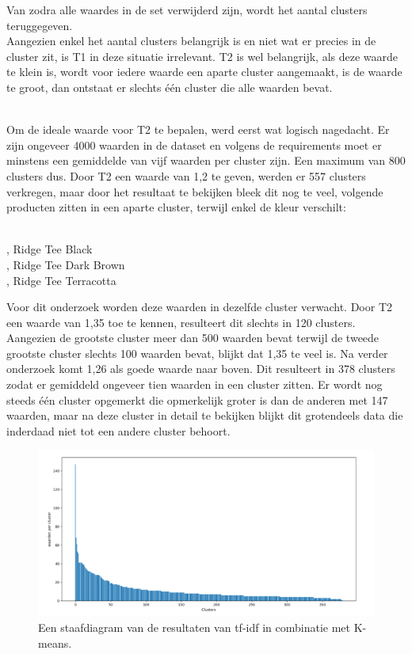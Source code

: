 Van zodra alle waardes in de set verwijderd zijn, wordt het aantal clusters teruggegeven.
\\\indent
Aangezien enkel het aantal clusters belangrijk is en niet wat er precies in de cluster zit, is T1 in deze situatie irrelevant. T2 is wel belangrijk, als deze waarde te klein is, wordt voor iedere waarde een aparte cluster aangemaakt, is de waarde te groot, dan ontstaat er slechts één cluster die alle waarden bevat.

\\\indent
Om de ideale waarde voor T2 te bepalen, werd eerst wat logisch nagedacht. Er zijn ongeveer 4000 waarden in de dataset en volgens de requirements moet er minstens een gemiddelde van vijf waarden per cluster zijn. Een maximum van 800 clusters dus. Door T2 een waarde van 1,2 te geven, werden er 557 clusters verkregen, maar door het resultaat te bekijken bleek dit nog te veel, volgende producten zitten in een aparte cluster, terwijl enkel de kleur verschilt:

\\ , Ridge Tee Black
\\ , Ridge Tee Dark Brown
\\ , Ridge Tee Terracotta
\\\indent

Voor dit onderzoek worden deze waarden in dezelfde cluster verwacht. Door T2 een waarde van 1,35 toe te kennen, resulteert dit slechts in 120 clusters. Aangezien de grootste cluster meer dan 500 waarden bevat terwijl de tweede grootste cluster slechts 100 waarden bevat, blijkt dat 1,35 te veel is. Na verder onderzoek komt 1,26 als goede waarde naar boven. Dit resulteert in 378 clusters zodat er gemiddeld ongeveer tien waarden in een cluster zitten. Er wordt nog steeds één cluster opgemerkt die opmerkelijk groter is dan de anderen met 147 waarden, maar na deze cluster in detail te bekijken blijkt dit grotendeels data die inderdaad niet tot een andere cluster behoort.
\\\indent
\begin{figure}[h]
    \centering
    \includegraphics[width=0.7\linewidth]{../foto's/datakmeanstfidf}
    \caption{Een staafdiagram van de resultaten van tf-idf in combinatie met K-means.}
    \label{fig:staafdiagram_k-means_tf-idf}
\end{figure}



